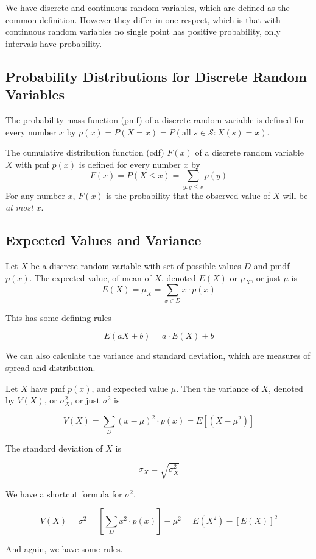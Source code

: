 We have discrete and continuous random variables, which are defined as the common definition. However they differ in one
respect, which is that with continuous random variables no single point has positive probability, only intervals have
probability.

    \subsection{Probability Distributions for Discrete Random Variables}
    The probability mass function (pmf) of a discrete random variable is defined for every number $x$ by
    $p(x)=P(X=x)=P(\text{all }s\in\mathcal{S}:X(s)=x)$.

    The cumulative distribution function (cdf) $F(x)$ of a discrete random variable $X$ with pmf $p(x)$ is defined for
    every number $x$ by
        \[ F(x) = P(X \le x) = \sum_{y:y \le x} p(y) \]
    For any number $x$, $F(x)$ is the probability that the observed value of $X$ will be \textit{at most} $x$.

    \subsection{Expected Values and Variance}
    Let $X$ be a discrete random variable with set of possible values $D$ and pmdf $p(x)$. The expected value, of mean
    of $X$, denoted $E(X)$ or $\mu_X$, or just $\mu$ is
        \[ E(X) = \mu_X = \sum_{x \in D} x \cdot p(x) \]

    This has some defining rules

        \[ E(aX + b) = a \cdot E(X) + b \]

    We can also calculate the variance and standard deviation, which are measures of spread and distribution.

    Let $X$ have pmf $p(x)$, and expected value $\mu$. Then the variance of $X$, denoted by $V(X)$, or $\sigma^2_X$, or
    just $\sigma^2$ is

        \[ V(X) = \sum_D {(x - \mu)}^2 \cdot p(x) = E[(X - \mu^2)] \]

    The standard deviation of $X$ is

        \[ \sigma_X = \sqrt{\sigma^2_X} \]

    We have a shortcut formula for $\sigma^2$.

        \[ V(X) = \sigma^2 = \left[ \sum_D x^2 \cdot p(x) \right] - \mu^2 = E(X^2) - {[E(X)]}^2 \]

    And again, we have some rules.

